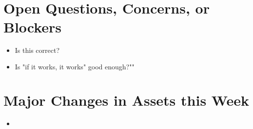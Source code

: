 \documentclass{article}
\begin{document}
\section*{Open Questions, Concerns, or Blockers}
\begin{itemize}[label={--}]
    \item Is this correct?
    \item Is "if it works, it works" good enough?""
\end{itemize}

\section*{Major Changes in Assets this Week}
\begin{itemize}[label={--}]
    \item  
\end{itemize}

\end{document}

